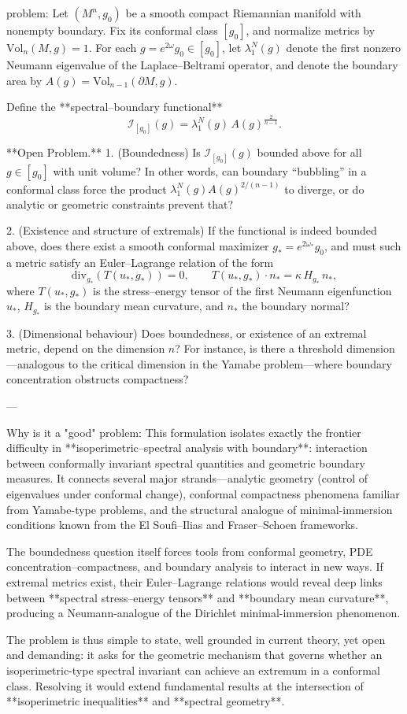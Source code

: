 problem:  
Let \( (M^n,g_0) \) be a smooth compact Riemannian manifold with nonempty boundary.  Fix its conformal class \([g_0]\), and normalize metrics by \(\mathrm{Vol}_n(M,g)=1\).  For each \(g=e^{2\omega}g_0\in[g_0]\), let \(\lambda_1^N(g)\) denote the first nonzero Neumann eigenvalue of the Laplace–Beltrami operator, and denote the boundary area by \(A(g)=\mathrm{Vol}_{n-1}(\partial M,g)\).  

Define the **spectral–boundary functional**
\[
\mathcal{I}_{[g_0]}(g)=\lambda_1^N(g)\,A(g)^{\frac{2}{n-1}}.
\]

**Open Problem.**  
1. (Boundedness) Is \(\mathcal{I}_{[g_0]}(g)\) bounded above for all \(g\in[g_0]\) with unit volume?  In other words, can boundary “bubbling” in a conformal class force the product  \(\lambda_1^N(g)A(g)^{2/(n-1)}\) to diverge, or do analytic or geometric constraints prevent that?  

2. (Existence and structure of extremals)  If the functional is indeed bounded above, does there exist a smooth conformal maximizer \(g_\ast=e^{2\omega_\ast}g_0\), and must such a metric satisfy an Euler–Lagrange relation of the form  
\[
\mathrm{div}_{g_\ast}(T(u_\ast,g_\ast))=0,\qquad  
T(u_\ast,g_\ast)\cdot n_\ast=\kappa\,H_{g_\ast}\,n_\ast,
\]
where \(T(u_\ast,g_\ast)\) is the stress–energy tensor of the first Neumann eigenfunction \(u_\ast\), \(H_{g_\ast}\) is the boundary mean curvature, and \(n_\ast\) the boundary normal?  

3. (Dimensional behaviour)  Does boundedness, or existence of an extremal metric, depend on the dimension \(n\)?  For instance, is there a threshold dimension—analogous to the critical dimension in the Yamabe problem—where boundary concentration obstructs compactness?

---

Why is it a "good" problem:  
This formulation isolates exactly the frontier difficulty in **isoperimetric–spectral analysis with boundary**: interaction between conformally invariant spectral quantities and geometric boundary measures.  It connects several major strands—analytic geometry (control of eigenvalues under conformal change), conformal compactness phenomena familiar from Yamabe-type problems, and the structural analogue of minimal-immersion conditions known from the El Soufi–Ilias and Fraser–Schoen frameworks.  

The boundedness question itself forces tools from conformal geometry, PDE concentration–compactness, and boundary analysis to interact in new ways.  If extremal metrics exist, their Euler–Lagrange relations would reveal deep links between **spectral stress–energy tensors** and **boundary mean curvature**, producing a Neumann-analogue of the Dirichlet minimal-immersion phenomenon.  

The problem is thus simple to state, well grounded in current theory, yet open and demanding: it asks for the geometric mechanism that governs whether an isoperimetric-type spectral invariant can achieve an extremum in a conformal class.  Resolving it would extend fundamental results at the intersection of **isoperimetric inequalities** and **spectral geometry**.